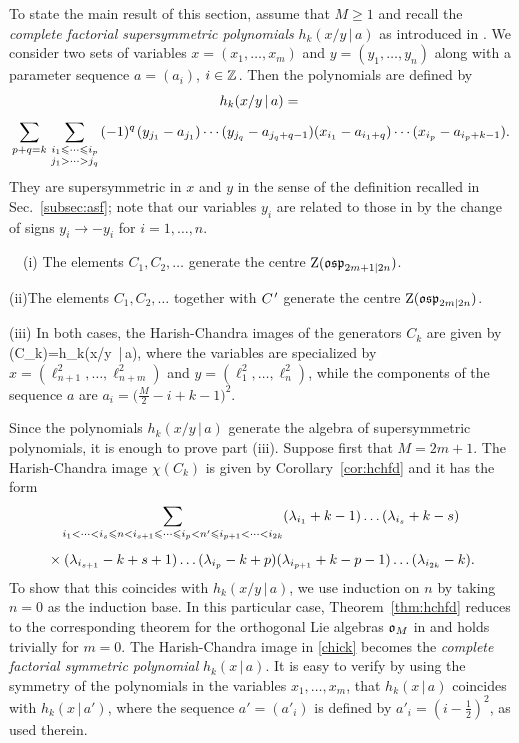 \documentclass[12pt]{article}
\begin{document}
To state the main result of this section, assume that $M\geqslant 1$ and recall the {\em complete factorial supersymmetric polynomials}
$h_k(x/y\, |\,a)$ as introduced in \cite{m:fs}. We consider two sets of variables $x=(x_1,\dots,x_m)$
and $y=(y_1,\dots,y_n)$ along with a parameter sequence $a=(a_i)$, $i\in\mathbb{Z}\hspace{1pt}$. Then
the polynomials are defined by
\begin{multline}
h_k(x/y\, |\,a)={}\\[0.4em]
 \sum_{p+q=k}\sum_{\begin{smallmatrix}i_1\leqslant \dots \leqslant i_p \\ j_1>\cdots > j_q\end{smallmatrix}} (-1)^q\hspace{1pt}(y_{j_1}- a_{j_1}) \cdots (y_{j_q} - a_{j_q + q-1}) (x_{i_1} - a_{i_1+q}) \cdots (x_{i_p} - a_{i_p+k-1}).
\label{hkxya}
\end{multline}
They are supersymmetric in $x$ and $y$ in the sense of the definition
recalled in Sec.~\ref{subsec:asf}; note that our variables $y_i$ are related to
those in \cite{m:fs} by the change of signs $y_i\to -y_i$ for $i=1,\dots,n$.

\bth\label{thm:hchfd}
\ \ (i)\quad
The elements $C_{1}, C_{2},\dots$ generate the centre ${\rm Z}(\mathfrak{osp}_{2m+1|2n})$.
\par
(ii)\quad The elements $C_{1}, C_{2},\dots$ together with $C^{\hspace{1pt}\prime}$ generate
the centre ${\rm Z}(\mathfrak{osp}_{2m|2n})$.
\par
(iii) \quad In both cases, the Harish-Chandra images of the generators $C_k$ are given by
\chi(C_k)=h_k(x/y\, |\,a),
\eeq
where the variables are specialized by $x=(\ell^2_{n+1},\dots,\ell^2_{n+m})$ and
$y=(\ell^2_{1},\dots,\ell^2_{n})$, while the components of the
sequence $a$ are $a_i=\big(\frac{M}2-i+k-1\big)^2$.
\eth

\bpf
Since the polynomials $h_k(x/y\, |\,a)$ generate the algebra of supersymmetric polynomials,
it is enough to prove part (iii). Suppose first that $M=2m+1$.
The Harish-Chandra image
$\chi(C_k)$ is given by Corollary~\ref{cor:hchfd} and it has the form
\begin{multline}\label{polla}
\sum_{i_1<\dots<i_s\leqslant n<i_{s+1}\leqslant\dots\leqslant i_p<n'\leqslant i_{p+1}<\dots<i_{2k}}
(\lambda_{i_1}+k-1)\dots(\lambda_{i_s}+k-s)\\[0.4em]
{}\times (\lambda_{i_{s+1}}-k+s+1)\dots
(\lambda_{i_{p}}-k+p)(\lambda_{i_{p+1}}+k-p-1)\dots (\lambda_{i_{2k}}-k).
\end{multline}
To show that this coincides with $h_k(x/y\, |\,a)$, we
use induction on $n$ by taking $n=0$ as the induction base.
In this particular case,
Theorem~\ref{thm:hchfd} reduces to the corresponding theorem
for the orthogonal Lie algebras $\mathfrak{o}_M$ in \cite[Prop.~5.4.1 and Sec.~13.4]{m:so}
and holds trivially for $m=0$.
The Harish-Chandra image in \eqref{chick} becomes
the {\em complete factorial symmetric polynomial} $h_k(x\, |\,a)$.
It is easy to verify by using the symmetry of the polynomials in the variables $x_1,\dots,x_m$,
that $h_k(x\, |\,a)$ coincides with $h_k(x\, |\,a')$, where the sequence $a'=(a'_i)$
is defined by $a'_i=(i-\frac12)^2$, as used therein.
\end{document}
